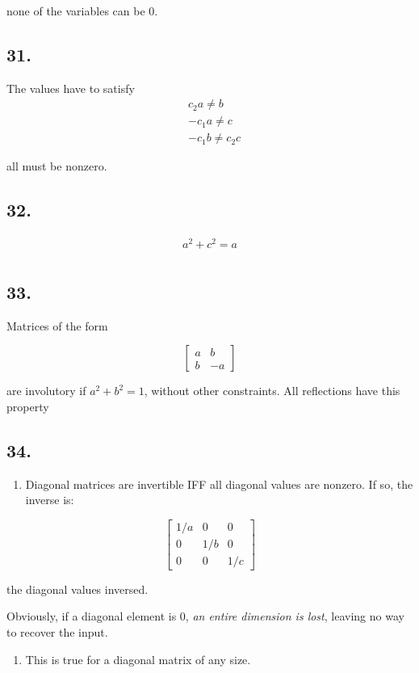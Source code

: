 \documentclass[]{article}
\providecommand{\tightlist}{%
  \setlength{\itemsep}{0pt}\setlength{\parskip}{0pt}}
\newcommand{\m}[1]{\begin{bmatrix}#1\end{bmatrix}}
\newcommand{\meq}[1]{\begin{split}#1\end{split}}
\begin{document}
none of the variables can be 0.

\hypertarget{section-72}{%
\subsection{31.}\label{section-72}}

The values have to satisfy \[\meq{&c_2a\neq{b}\\
&-c_1a\neq{c}\\
&-c_1b\neq{c_2c}}\]

all must be nonzero.

\hypertarget{section-73}{%
\subsection{32.}\label{section-73}}

\[\meq{a^2+c^2=a\\
}\]

\hypertarget{section-74}{%
\subsection{33.}\label{section-74}}

Matrices of the form

\[\m{a&b\\
b&-a}\]

are involutory if \(a^2+b^2=1\), without other constraints. All
reflections have this property

\hypertarget{section-75}{%
\subsection{34.}\label{section-75}}

\begin{enumerate}
\def\labelenumi{\alph{enumi}.}
\tightlist
\item
  Diagonal matrices are invertible IFF all diagonal values are nonzero.
  If so, the inverse is:
\end{enumerate}

\[\m{1/a&0&0\\
0&1/b&0\\
0&0&1/c}\]

the diagonal values inversed.

Obviously, if a diagonal element is 0, \emph{an entire dimension is
lost}, leaving no way to recover the input.

\begin{enumerate}
\def\labelenumi{\alph{enumi}.}
\setcounter{enumi}{1}
\tightlist
\item
  This is true for a diagonal matrix of any size.
\end{enumerate}
\end{document}
